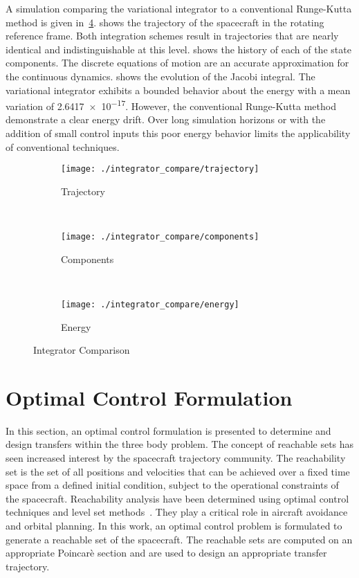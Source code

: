 \documentclass[letterpaper, preprint, paper,11pt]{AAS}	%
\begin{document}
A simulation comparing the variational integrator to a conventional Runge-Kutta method is given in~\cref{fig:integrator_compare}.
 shows the trajectory of the spacecraft in the rotating reference frame.
Both integration schemes result in trajectories that are nearly identical and indistinguishable at this level.
 shows the history of each of the state components. 
The discrete equations of motion are an accurate approximation for the continuous dynamics.
 shows the evolution of the Jacobi integral.
The variational integrator exhibits a bounded behavior about the energy with a mean variation of \num{2.6417e-17}.
However, the conventional Runge-Kutta method demonstrate a clear energy drift. 
Over long simulation horizons or with the addition of small control inputs this poor energy behavior limits the applicability of conventional techniques.
\begin{figure} 
	\centering 
	\begin{subfigure}[htbp]{0.4\textwidth} 
		\texttt{[image: ./integrator\_compare/trajectory]} 
		\caption{Trajectory} \label{fig:compare_trajectory} 
	\end{subfigure}~ %
	\begin{subfigure}[htbp]{0.4\textwidth} 
		\texttt{[image: ./integrator\_compare/components]} 
		\caption{Components} \label{fig:compare_components} 
	\end{subfigure} ~ %
	\begin{subfigure}[htbp]{0.4\textwidth} 
		\texttt{[image: ./integrator\_compare/energy]} 
		\caption{Energy} \label{fig:compare_energy} 
	\end{subfigure} 
	\caption{Integrator Comparison}
	\label{fig:integrator_compare} 
\end{figure}

\section{Optimal Control Formulation}\label{sec:optimal_control}
In this section, an optimal control formulation is presented to determine and design transfers within the three body problem.
The concept of reachable sets has seen increased interest by the spacecraft trajectory community.
The reachability set is the set of all positions and velocities that can be achieved over a fixed time space from a defined initial condition, subject to the operational constraints of the spacecraft.
Reachability analysis have been determined using optimal control techniques and level set methods~\cite{mitchell2002}.
They play a critical role in aircraft avoidance and orbital planning.
In this work, an optimal control problem is formulated to generate a reachable set of the spacecraft.
The reachable sets are computed on an appropriate Poincar\`e section and are used to design an appropriate transfer trajectory.
\end{document}
